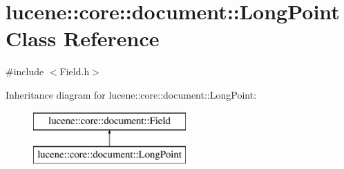 \hypertarget{classlucene_1_1core_1_1document_1_1LongPoint}{}\section{lucene\+:\+:core\+:\+:document\+:\+:Long\+Point Class Reference}
\label{classlucene_1_1core_1_1document_1_1LongPoint}


{\ttfamily \#include $<$Field.\+h$>$}

Inheritance diagram for lucene\+:\+:core\+:\+:document\+:\+:Long\+Point\+:\begin{figure}[H]
\begin{center}
\leavevmode
\includegraphics[height=2.000000cm]{classlucene_1_1core_1_1document_1_1LongPoint}
\end{center}
\end{figure}
